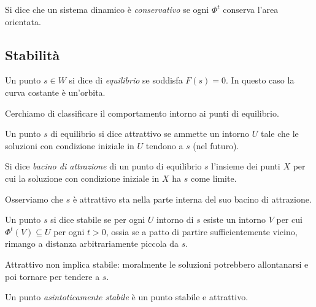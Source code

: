 \documentclass[a4paper,10pt,oneside]{math_article}
\begin{document}
	
	\begin{mydef}
		Si dice che un sistema dinamico è \emph{conservativo} se ogni $\Phi^t$ conserva l'area orientata.
	\end{mydef}
	
	\subsection{Stabilità}
	\begin{mydef}
		Un punto $s \in W$ si dice di \emph{equilibrio} se soddisfa $F(s)=0$. In questo caso la curva costante è un'orbita.
	\end{mydef}
	
	Cerchiamo di classificare il comportamento intorno ai punti di equilibrio.
	
	\begin{mydef}
		Un punto $s$ di equilibrio si dice attrattivo se ammette un intorno $U$ tale che le soluzioni con condizione iniziale in $U$ tendono a $s$ (nel futuro).
	\end{mydef}
	
	\begin{mydef}
		Si dice \emph{bacino di attrazione} di un punto di equilibrio $s$ l'insieme dei punti $X$ per cui la soluzione con condizione iniziale in $X$ ha $s$ come limite.
	\end{mydef}
	
	\begin{myobs}
		Osserviamo che $s$ è attrattivo sta nella parte interna del suo bacino di attrazione. 
	\end{myobs}
	
	\begin{mydef}[Stabilità]
		Un punto $s$ si dice stabile se per ogni $U$ intorno di $s$ esiste un intorno $V$ per cui $\Phi^t(V) \subseteq U$ per ogni $t>0$, ossia se a patto di partire sufficientemente vicino, rimango a distanza arbitrariamente piccola da $s$. 
	\end{mydef}
	
	\begin{myobs}
		Attrattivo non implica stabile: moralmente le soluzioni potrebbero allontanarsi e poi tornare per tendere a $s$.
	\end{myobs}
	
	\begin{mydef}
		Un punto \emph{asintoticamente stabile} è un punto stabile e attrattivo.
	\end{mydef}
	
\end{document}
